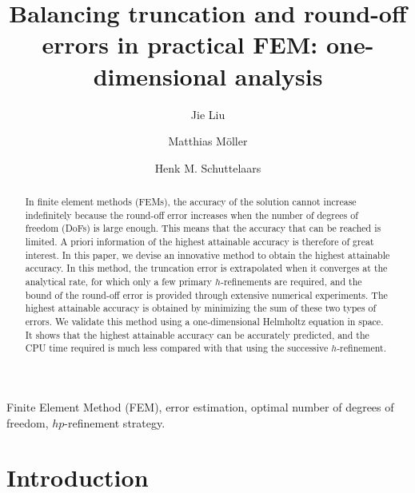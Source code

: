 \documentclass[review,3p]{elsarticle}
\begin{document}

\begin{frontmatter}

\title{Balancing truncation and round-off errors in practical FEM: one-dimensional analysis}

 \author[1]{Jie Liu}
 \author[1]{Matthias M\"oller}
 \author[1]{Henk M. Schuttelaars}
 
 \address[1]{Delft Institute of Applied Mathematics\\ Delft University of Technology\\ Van Mourik Broekmanweg 6, 2628 XE Delft, The Netherlands}

\begin{abstract}
In finite element methods (FEMs), the accuracy of the solution cannot increase indefinitely because the round-off error increases when the number of degrees of freedom (DoFs) is large enough. This means that the accuracy that can be reached is limited. A priori information of the highest attainable accuracy is therefore of great interest.   
In this paper, we devise an innovative method to obtain the highest attainable accuracy.
In this method, the truncation error is extrapolated when it converges at the analytical rate, for which only a few primary $h$-refinements are required, and the bound of the round-off error is provided through extensive numerical experiments. The highest attainable accuracy is obtained by minimizing the sum of these two types of errors.
We validate this method using a one-dimensional Helmholtz equation in space. 
It shows that the highest attainable accuracy can be accurately predicted, and the CPU time required is much less compared with that using the successive $h$-refinement. 
\end{abstract}

\begin{keyword}
Finite Element Method (FEM), error estimation, optimal number of degrees of freedom, $hp$-refinement strategy.
\end{keyword}

\end{frontmatter}

\section{Introduction}
\end{document}
